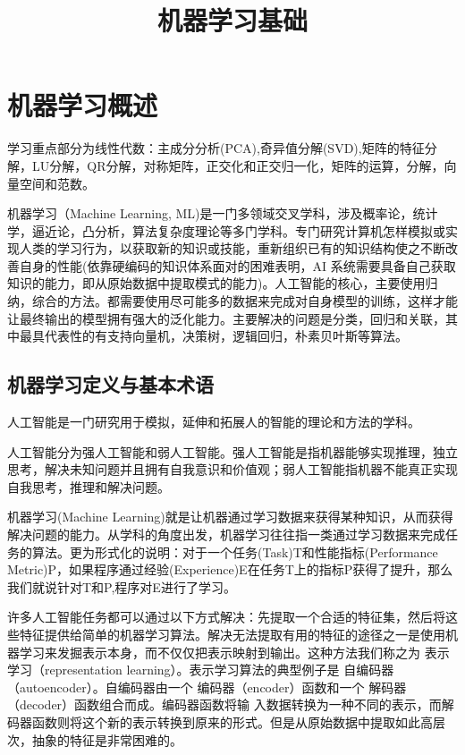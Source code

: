 \documentclass[openbib]{article}
\begin{document}
	\title{机器学习基础}
	
	\maketitle
	
	\newpage
	\tableofcontents
	\newpage
	

\section{机器学习概述}
学习重点部分为线性代数：主成分分析(PCA),奇异值分解(SVD),矩阵的特征分解，LU分解，QR分解，对称矩阵，正交化和正交归一化，矩阵的运算，分解，向量空间和范数。

机器学习（Machine Learning, ML)是一门多领域交叉学科，涉及概率论，统计学，逼近论，凸分析，算法复杂度理论等多门学科。专门研究计算机怎样模拟或实现人类的学习行为，以获取新的知识或技能，重新组织已有的知识结构使之不断改善自身的性能(依靠硬编码的知识体系面对的困难表明，AI 系统需要具备自己获取知识的能力，即从原始数据中提取模式的能力)。人工智能的核心，主要使用归纳，综合的方法。都需要使用尽可能多的数据来完成对自身模型的训练，这样才能让最终输出的模型拥有强大的泛化能力。主要解决的问题是分类，回归和关联，其中最具代表性的有支持向量机，决策树，逻辑回归，朴素贝叶斯等算法。
\subsection{机器学习定义与基本术语}
人工智能是一门研究用于模拟，延伸和拓展人的智能的理论和方法的学科。

人工智能分为强人工智能和弱人工智能。强人工智能是指机器能够实现推理，独立思考，解决未知问题并且拥有自我意识和价值观；弱人工智能指机器不能真正实现自我思考，推理和解决问题。

机器学习(Machine Learning)就是让机器通过学习数据来获得某种知识，从而获得解决问题的能力。从学科的角度出发，机器学习往往指一类通过学习数据来完成任务的算法。更为形式化的说明：对于一个任务(Task)T和性能指标(Performance Metric)P，如果程序通过经验(Experience)E在任务T上的指标P获得了提升，那么我们就说针对T和P,程序对E进行了学习。

许多人工智能任务都可以通过以下方式解决：先提取一个合适的特征集，然后将这些特征提供给简单的机器学习算法。解决无法提取有用的特征的途径之一是使用机器学习来发掘表示本身，而不仅仅把表示映射到输出。这种方法我们称之为 表示学习（representation learning）。表示学习算法的典型例子是 自编码器（autoencoder）。自编码器由一个 编码器（encoder）函数和一个 解码器（decoder）函数组合而成。编码器函数将输
入数据转换为一种不同的表示，而解码器函数则将这个新的表示转换到原来的形式。但是从原始数据中提取如此高层次，抽象的特征是非常困难的。
\end{document}
